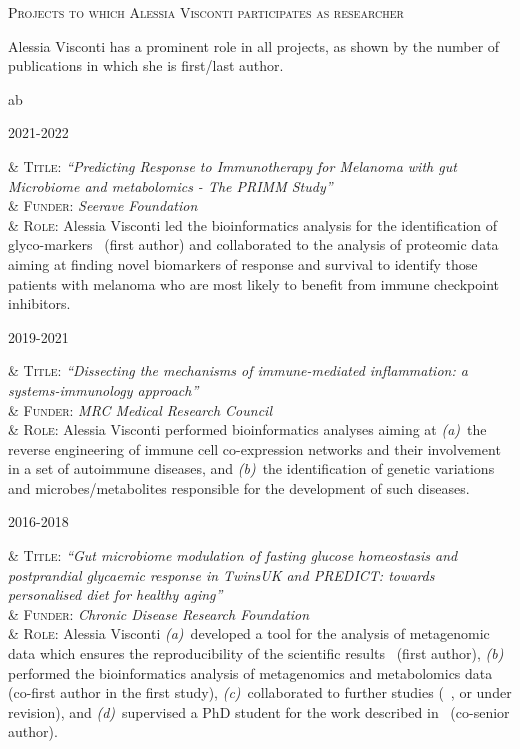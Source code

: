 \documentclass[a4paper,10pt]{article}
\newcommand{\smalltitle}[1]{
	\vspace{0.1cm}
	{\noindent 
	\large \textsc{#1}}
	\vspace{0.1cm}
}
\newenvironment{singletablelist}
{	\vspace{-0.2cm}
	\begin{longtable}[!h]{ab}}{\end{longtable}
}
\newcommand{\stlist}[2]{
	\hspace{-3cm}
	\noindent
	\begin{minipage}{0.24\textwidth}
	\begin{flushright}
	\textsc{#1}
	\end{flushright}
	\end{minipage}
	& #2\\[0.2cm]
}
\begin{document}
\smalltitle{Projects to which Alessia Visconti participates as researcher}

\noindent  Alessia Visconti has a prominent role in all projects, as shown by the number of publications in which she is first/last author.

\vspace{0.1cm}

\begin{singletablelist}

	\stlist{2021-2022}{
		\textsc{Title:} \emph{``Predicting Response to Immunotherapy for Melanoma with gut Microbiome and metabolomics - The PRIMM Study''}\\
		& \textsc{Funder:} \emph{Seerave Foundation}\\
		& \textsc{Role:} Alessia Visconti led the bioinformatics analysis for the identification of glyco-markers~\cite{Vis23} (first author) and collaborated to the analysis of proteomic data~\cite{Ros22} aiming at finding novel biomarkers of response and survival to identify those patients with melanoma who are most likely to benefit from immune checkpoint inhibitors.}
	
	\stlist{2019-2021}{ 
		\textsc{Title:} \emph{``Dissecting the mechanisms of immune-mediated inflammation: a systems-immunology approach''}\\
		& \textsc{Funder:} \emph{MRC Medical Research Council}\\
		& \textsc{Role:} Alessia Visconti performed bioinformatics analyses aiming at \emph{(a)}~the reverse engineering of immune cell co-expression networks and their involvement in a set of autoimmune diseases, and \emph{(b)}~the identification of genetic variations and microbes/metabolites responsible for the development of such diseases.}
	
	\stlist{2016-2018}{ 
		\textsc{Title:} \emph{``Gut microbiome modulation of fasting glucose homeostasis and postprandial glycaemic response in TwinsUK and PREDICT: towards personalised diet for healthy aging''}\\
		& \textsc{Funder:} \emph{Chronic Disease Research Foundation}\\
		& \textsc{Role:} Alessia Visconti \emph{(a)}~developed a tool for the analysis of metagenomic data which ensures the reproducibility of the scientific results~\cite{Vis18b} (first author), \emph{(b)} performed the bioinformatics analysis of metagenomics and metabolomics data~\cite{Vis19,Bar20} (co-first author in the first study), \emph{(c)}~collaborated to further studies (~\cite{Lou23,Nog23a,Nog23b}, or under revision), and \emph{(d)}~supervised a PhD student for the work described in~\cite{Zha22} (co-senior author).
}

\end{singletablelist}
\end{document}

